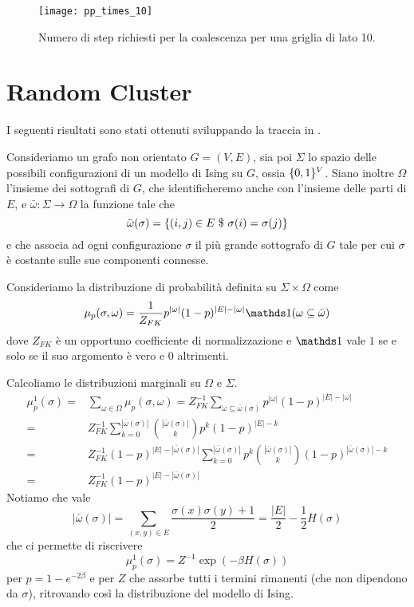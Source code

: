 \documentclass[]{marticle}
\begin{document}
\begin{figure}[h!]
\caption{Numero di step richiesti per la coalescenza per una griglia di lato 10.}
\texttt{[image: pp\_times\_10]}
\label{fig:plot1}
\centering
\end{figure}

\section{Random Cluster}
I seguenti risultati sono stati ottenuti sviluppando la traccia in
\cite{edwards-sokal}.

Consideriamo un grafo non orientato $G=(V,E)$, sia poi $\Sigma$ lo spazio delle
possibili configurazioni di un modello di Ising su $G$, ossia $\{0,1\}^V$.
Siano inoltre $\Omega$ l'insieme dei sottografi di $G$, che identificheremo
anche con l'insieme delle parti di $E$, e $\bar{\omega}\colon \Sigma
\longrightarrow \Omega$ la funzione tale che 
\[
    \bar{\omega}(\sigma) = \{(i,j)\in E \ \$\  \sigma(i) = \sigma(j)\}
\]
e che associa ad ogni configurazione $\sigma$ il pi\`u grande sottografo di $G$
tale per cui $\sigma$ \`e costante sulle sue componenti connesse.

Consideriamo la distribuzione di probabilit\`a definita su $\Sigma \times
\Omega$ come
\[
    \mu_p(\sigma, \omega) = \frac{1}{Z_{FK}} p^{|\omega|} (1-p)^{|E| - |\omega|}
    \ind(\omega \subseteq \bar{\omega})
\]
dove $Z_{FK}$ \`e un opportuno coefficiente di normalizzazione e $\ind$ vale $1$ se
e solo se il suo argomento \`e vero e $0$ altrimenti.

Calcoliamo le distribuzioni marginali su $\Omega$ e $\Sigma$.
\begin{align*}
    \mu^1_p(\sigma) =& \sum_{\omega\in\Omega} \mu_p(\sigma,\omega) = 
    Z_{FK}^{-1} \sum_{\omega\subseteq\bar{\omega}(\sigma)}  p^{|\omega|}
    (1-p)^{|E| - |\omega|} \\
    =& Z_{FK}^{-1} \sum_{k=0}^{|\bar{\omega}(\sigma)|}
        \binom{|\bar{\omega}(\sigma)|}{k}
        p^k (1-p)^{|E| - k} \\
    =& Z_{FK}^{-1} (1-p)^{|E|-|\bar{\omega}(\sigma)|}
        \sum_{k=0}^{|\bar{\omega}(\sigma)|}  p^k
        \binom{|\bar{\omega}(\sigma)|}{k}
        (1-p)^{|\bar{\omega}(\sigma)| - k} \\
    =& Z_{FK}^{-1} (1-p)^{|E|-|\bar{\omega}(\sigma)|}
\end{align*}
Notiamo che vale
\[
    |\bar{\omega}(\sigma)| = \sum_{(x,y)\in E} \frac{\sigma(x) \sigma(y) +
    1}{2} = \frac{|E|}{2} - \frac{1}{2}H(\sigma)
\]
che ci permette di riscrivere
\[
    \mu^1_p(\sigma) = Z^{-1} \exp(-\beta H(\sigma))
\]
per $p = 1-e^{-2\beta}$ e per $Z$ che assorbe tutti i termini rimanenti (che non
dipendono da $\sigma$), ritrovando cos\`i la distribuzione del modello di Ising.
\end{document}
